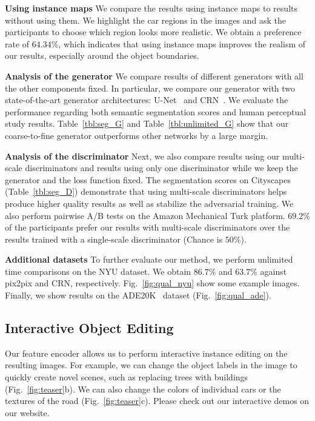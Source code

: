 { \bf Using instance maps} We compare the results using instance maps to results without using them. We highlight the car regions in the images and ask the participants to choose which region looks more realistic. We obtain a preference rate of $64.34\%$, which indicates that using instance maps improves the realism of our results, especially around the object boundaries.

{ \bf Analysis of the generator } We compare results of different generators with all the other components fixed. In particular, we compare our generator with two state-of-the-art generator architectures: U-Net~\cite{ronneberger2015u,isola2016image} and CRN~\cite{chen2017photographic}. We evaluate the performance regarding both semantic segmentation scores and human perceptual study results. Table~\ref{tbl:seg_G} and Table~\ref{tbl:unlimited_G} show that our coarse-to-fine generator outperforms other networks by a large margin.

{ \bf Analysis of the discriminator } Next, we also compare results using our multi-scale discriminators and results using only one discriminator while we keep the generator and the loss function fixed. The segmentation scores on Cityscapes~\cite{Cordts2016cityscapes} (Table~\ref{tbl:seg_D}) demonstrate that using multi-scale discriminators helps produce higher quality results as well as stabilize the adversarial training. We also perform pairwise A/B tests on the Amazon Mechanical Turk platform. $69.2\%$ of the participants prefer our results with multi-scale discriminators over the results trained with a single-scale discriminator (Chance is $50\%$).

{ \bf Additional datasets } To further evaluate our method, we perform unlimited time comparisons on the NYU dataset. We obtain $86.7\%$ and $63.7\%$ against pix2pix and CRN, respectively. Fig.~\ref{fig:qual_nyu} show some example images. Finally, we show results on the ADE20K~\cite{zhou2017scene} dataset (Fig.~\ref{fig:qual_ade}).

\subsection{Interactive Object Editing} \label{sec:results:ui}
Our feature encoder allows us to perform interactive instance editing on the resulting images. For example, we can change the object labels in the image to quickly create novel scenes, such as replacing trees with buildings (Fig.~\ref{fig:teaser}b).
We can also change the colors of individual cars or the textures of the road (Fig.~\ref{fig:teaser}c).
Please check out our interactive demos on our website.

